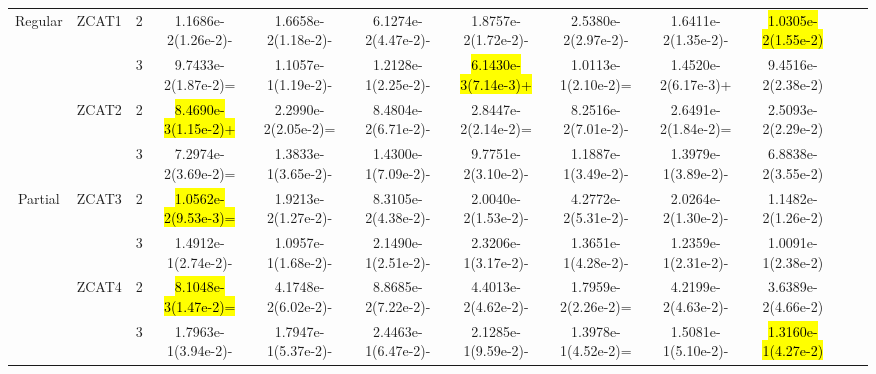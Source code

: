 \documentclass[a4paper,fleqn]{cas-dc}
\newcommand{\highlight}[1]{
	\begingroup
	\sethlcolor{Seashell}%
	\hl{#1}%
	\endgroup
}
\begin{document}
\begin{sloppypar}
\begin{table}[ht]
{\begin{tabular}{cccccccccccc}
					
					
					
					
					\multirow{4}{*}{Regular}&\multirow{2}{*}{ZCAT1}&2	&1.1686e-2(1.26e-2)-	&1.6658e-2(1.18e-2)-	&6.1274e-2(4.47e-2)-	&1.8757e-2(1.72e-2)-	&2.5380e-2(2.97e-2)-	&1.6411e-2(1.35e-2)-	&\highlight{1.0305e-2(1.55e-2)}\\
					
					
					\multirow{4}{*}{~}&\multirow{2}{*}{~}&3	&9.7433e-2(1.87e-2)=	&1.1057e-1(1.19e-2)-	&1.2128e-1(2.25e-2)-	&\highlight{6.1430e-3(7.14e-3)+}	&1.0113e-1(2.10e-2)=	&1.4520e-2(6.17e-3)+	&9.4516e-2(2.38e-2)\\
					
					
					
					\multirow{4}{*}{~}&\multirow{2}{*}{ZCAT2}&2 &\highlight{8.4690e-3(1.15e-2)+}	&2.2990e-2(2.05e-2)=	&8.4804e-2(6.71e-2)-	&2.8447e-2(2.14e-2)=	&8.2516e-2(7.01e-2)-	&2.6491e-2(1.84e-2)=	&2.5093e-2(2.29e-2)\\
					
					\multirow{4}{*}{~}&\multirow{2}{*}{~}&3  &7.2974e-2(3.69e-2)=	&1.3833e-1(3.65e-2)-	&1.4300e-1(7.09e-2)-	&9.7751e-2(3.10e-2)-	&1.1887e-1(3.49e-2)-	&1.3979e-1(3.89e-2)-	&6.8838e-2(3.55e-2)\\
					\hline
					
					
					
					
					\multirow{8}{*}{Partial}&\multirow{2}{*}{ZCAT3}&2 &\highlight{1.0562e-2(9.53e-3)=}	&1.9213e-2(1.27e-2)-	&8.3105e-2(4.38e-2)-	&2.0040e-2(1.53e-2)-	&4.2772e-2(5.31e-2)-	&2.0264e-2(1.30e-2)-	&1.1482e-2(1.26e-2)\\
					
					\multirow{8}{*}{~}&\multirow{2}{*}{~}&3		&1.4912e-1(2.74e-2)-	&1.0957e-1(1.68e-2)-	&2.1490e-1(2.51e-2)-	&2.3206e-1(3.17e-2)-	&1.3651e-1(4.28e-2)-	&1.2359e-1(2.31e-2)-	&1.0091e-1(2.38e-2)\\
					
					
					
					\multirow{8}{*}{~}&\multirow{2}{*}{ZCAT4}&2	&\highlight{8.1048e-3(1.47e-2)=}		&4.1748e-2(6.02e-2)-	&8.8685e-2(7.22e-2)-	&4.4013e-2(4.62e-2)-	&1.7959e-2(2.26e-2)=	&4.2199e-2(4.63e-2)-	&3.6389e-2(4.66e-2)\\
					
					\multirow{8}{*}{~}&\multirow{2}{*}{~}&3	&1.7963e-1(3.94e-2)-	&1.7947e-1(5.37e-2)-	&2.4463e-1(6.47e-2)-	&2.1285e-1(9.59e-2)-	&1.3978e-1(4.52e-2)=	&1.5081e-1(5.10e-2)-	&\highlight{1.3160e-1(4.27e-2)}\\
					

\end{tabular}}
\end{table}
\end{sloppypar}
\end{document}
